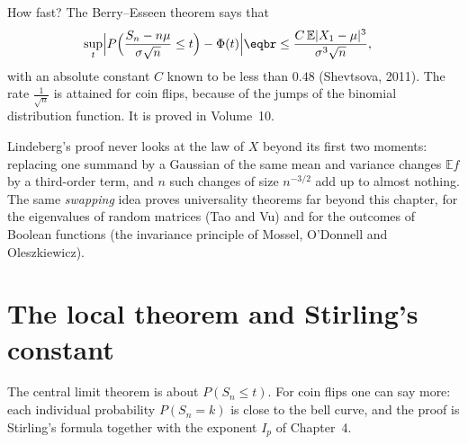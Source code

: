 \begin{remark}
How fast? The Berry--Esseen theorem says that
\[
\begin{aligned}\sup_t\Bigl|P\Bigl(\frac{S_n-n\mu}{\sigma\sqrt n}\le t\Bigr)-\Phi(t)\Bigr|&\eqbr\le\frac{C\,\mathbb E|X_1-\mu|^3}{\sigma^3\sqrt n},\end{aligned}
\]
with an absolute constant $C$
known to be less than $0.48$ (Shevtsova, 2011). The rate $\frac1{\sqrt n}$ is attained for coin flips, because of the jumps of the binomial
distribution function. It is proved in Volume~10.
\end{remark}

\begin{beauty}
Lindeberg's proof never looks at the law of $X$ beyond its first two moments: replacing one summand by a
Gaussian of the same mean and variance changes $\mathbb E f$ by a third-order term, and $n$ such changes of size $n^{-3/2}$
add up to almost nothing. The same \emph{swapping} idea proves universality theorems far beyond this chapter, for the
eigenvalues of random matrices (Tao and Vu) and for the outcomes of Boolean functions (the invariance principle of
Mossel, O'Donnell and Oleszkiewicz).
\end{beauty}

\section{The local theorem and Stirling's constant}

The central limit theorem is about $P(S_n\le t)$. For coin flips one can say more: each individual probability $P(S_n=k)$ is
close to the bell curve, and the proof is Stirling's formula together with the exponent $I_p$ of Chapter~4.

